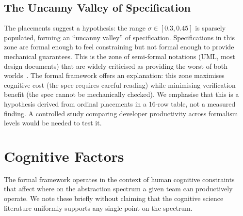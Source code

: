 \documentclass[11pt, a4paper, logo, copyright]{googledeepmind}
\begin{document}
\begin{table}[H]
\caption{Placement of major thinkers on the specificity-compression plane. Values are ordinal estimates based on each thinker's published positions, not computed quantities. $^\dagger$Range reflects the thinker's position that the appropriate level varies by task or context; we estimate the range their work typically occupies. $^\ddagger$These thinkers reject the premise that their position can be mapped onto a fixed $(\sigma, \kappa)$ point (see text). Three clusters emerge: the \emph{formal cluster} ($\hat{\sigma} > 0.7$), the \emph{middle ground} ($0.4 < \hat{\sigma} < 0.7$), and the \emph{NL cluster} ($\hat{\sigma} < 0.3$). Subject to the ordinal reliability of these placements, we hypothesise a gap at $0.3 < \hat{\sigma} < 0.45$, the ``uncanny valley'' of specification.}
\label{tab:thinker-placement}
\end{table}

\subsection{The Uncanny Valley of Specification}

The placements suggest a hypothesis: the range $\sigma \in [0.3, 0.45]$ is sparsely populated, forming an ``uncanny valley'' of specification. Specifications in this zone are formal enough to feel constraining but not formal enough to provide mechanical guarantees. This is the zone of semi-formal notations (UML, most design documents) that are widely criticised as providing the worst of both worlds~\citep{jackson2021essence}. The formal framework offers an explanation: this zone maximises cognitive cost (the spec requires careful reading) while minimising verification benefit (the spec cannot be mechanically checked). We emphasise that this is a hypothesis derived from ordinal placements in a 16-row table, not a measured finding. A controlled study comparing developer productivity across formalism levels would be needed to test it.


\section{Cognitive Factors}
\label{sec:cognitive}

The formal framework operates in the context of human cognitive constraints that affect where on the abstraction spectrum a given team can productively operate. We note these briefly without claiming that the cognitive science literature uniformly supports any single point on the spectrum.
\end{document}
